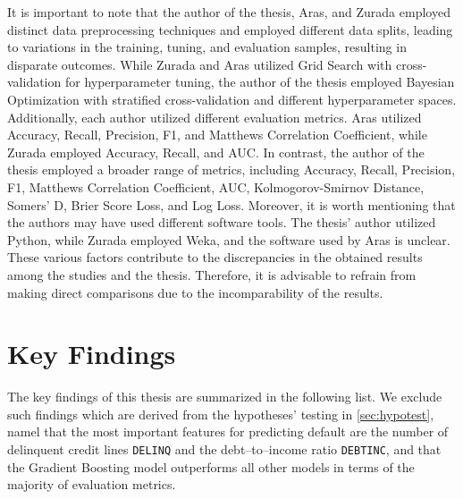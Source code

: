 It is important to note that the author of the thesis, Aras, and Zurada employed distinct data preprocessing techniques and employed different data splits, leading to variations in the training, tuning, and evaluation samples, resulting in disparate outcomes.
While Zurada and Aras utilized Grid Search with cross-validation for hyperparameter tuning, the author of the thesis employed Bayesian Optimization with stratified cross-validation and different hyperparameter spaces.
Additionally, each author utilized different evaluation metrics. Aras utilized Accuracy, Recall, Precision, F1, and Matthews Correlation Coefficient, while Zurada employed Accuracy, Recall, and AUC.
In contrast, the author of the thesis employed a broader range of metrics, including Accuracy, Recall, Precision, F1, Matthews Correlation Coefficient, AUC, Kolmogorov-Smirnov Distance, Somers' D, Brier Score Loss, and Log Loss.
Moreover, it is worth mentioning that the authors may have used different software tools. The thesis' author utilized Python, while Zurada employed Weka, and the software used by Aras is unclear.
These various factors contribute to the discrepancies in the obtained results among the studies and the thesis. Therefore, it is advisable to refrain from making direct comparisons due to the incomparability of the results.
\vspace{0.3cm}

\newpage
\section{Key Findings}
\label{sec:keyfindings}
The key findings of this thesis are summarized in the following list. We exclude such findings which are derived from the hypotheses' testing in \autoref{sec:hypotest}, namel that the most important features for predicting default are the number of delinquent credit lines \texttt{DELINQ} and the debt--to--income ratio \texttt{DEBTINC}, and that the Gradient Boosting model outperforms all other models in terms of the majority of evaluation metrics.

